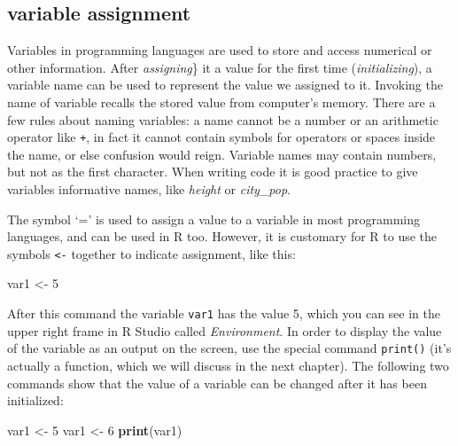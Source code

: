 \documentclass[
]{book}
\newenvironment{Shaded}{\begin{snugshade}}{\end{snugshade}}
\newcommand{\DecValTok}[1]{\textcolor[rgb]{0.00,0.00,0.81}{#1}}
\newcommand{\KeywordTok}[1]{\textcolor[rgb]{0.13,0.29,0.53}{\textbf{#1}}}
\newcommand{\NormalTok}[1]{#1}
\newcommand{\StringTok}[1]{\textcolor[rgb]{0.31,0.60,0.02}{#1}}
\begin{document}
\hypertarget{variable-assignment}{%
\subsection{variable assignment}\label{variable-assignment}}

Variables in programming languages are used to store and access numerical or other information. After \emph{assigning}\} it a value for the first time (\emph{initializing}), a variable name can be used to represent the value we assigned to it. Invoking the name of variable recalls the stored value from computer's memory. There are a few rules about naming variables: a name cannot be a number or an arithmetic operator like \texttt{+}, in fact it cannot contain symbols for operators or spaces inside the name, or else confusion would reign. Variable names may contain numbers, but not as the first character. When writing code it is good practice to give variables informative names, like \emph{height} or \emph{city\_pop}. 

The symbol `=' is used to assign a value to a variable in most programming languages, and can be used in R too. However, it is customary for R to use the symbols \texttt{\textless{}-} together to indicate assignment, like this:

\begin{Shaded}
\begin{Highlighting}[]
\NormalTok{var1 \textless{}{-}}\StringTok{ }\DecValTok{5}
\end{Highlighting}
\end{Shaded}

After this command the variable \texttt{var1} has the value 5, which you can see in the upper right frame in R Studio called \emph{Environment}. In order to display the value of the variable as an output on the screen, use the special command \texttt{print()} (it's actually a function, which we will discuss in the next chapter). The following two commands show that the value of a variable can be changed after it has been initialized:

\begin{Shaded}
\begin{Highlighting}[]
\NormalTok{var1 \textless{}{-}}\StringTok{ }\DecValTok{5}
\NormalTok{var1 \textless{}{-}}\StringTok{ }\DecValTok{6}
\KeywordTok{print}\NormalTok{(var1)}
\end{Highlighting}
\end{Shaded}
\end{document}
